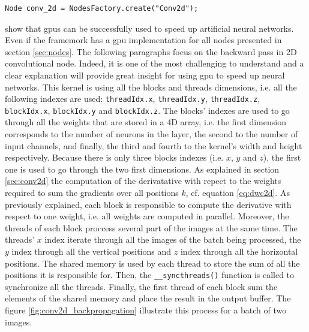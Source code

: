 \documentclass[11pt]{report}
\begin{document}
\begin{verbatim}
Node conv_2d = NodesFactory.create("Conv2d");
\end{verbatim}

\noindent \textcite{DBLP:journals/tjs/BritoFCSWMF16} show that \acrshort{gpu}s can be successfully used to speed up artificial neural networks. Even if the framemork has a \acrshort{gpu} implementation for all nodes presented in section \ref{sec:nodes}. The following paragraphs focus on the backward pass in 2D convolutional node. Indeed, it is one of the most challenging to understand and a clear explanation will provide great insight for using \acrshort{gpu} to speed up neural networks. This kernel is using all the blocks and threads dimensions, i.e. all the following indexes are used: \texttt{threadIdx.x}, \texttt{threadIdx.y}, \texttt{threadIdx.z}, \texttt{blockIdx.x}, \texttt{blockIdx.y} and \texttt{blockIdx.z}. The blocks' indexes are used to go through all the weights that are stored in a 4D array, i.e. the first dimension corresponds to the number of neurons in the layer, the second to the number of input channels, and finally, the third and fourth to the kernel's width and height respectively. Because there is only three blocks indexes (i.e. $x$, $y$ and $z$), the first one is used to go through the two first dimensions. As explained in section \ref{sec:conv2d} the computation of the derivatative with repect to the weights required to sum the gradients over all positions $k$, cf. equation \ref{eq:dwc2d}. As previously explained, each block is responsible to compute the derivative with respect to one weight, i.e. all weights are computed in parallel. Moreover, the threads of each block proccess several part of the images at the same time. The threads' $x$ index iterate through all the images of the batch being processed, the $y$ index through all the vertical positions and $z$ index through all the horizontal positions. The shared memory is used by each thread to store the sum of all the positions it is responsible for. Then, the \texttt{__syncthreads()} function is called to synchronize all the threads. Finally, the first thread of each block sum the elements of the shared memory and place the result in the output buffer. The figure \ref{fig:conv2d_backpropagation} illustrate this process for a batch of two images.
\end{document}
